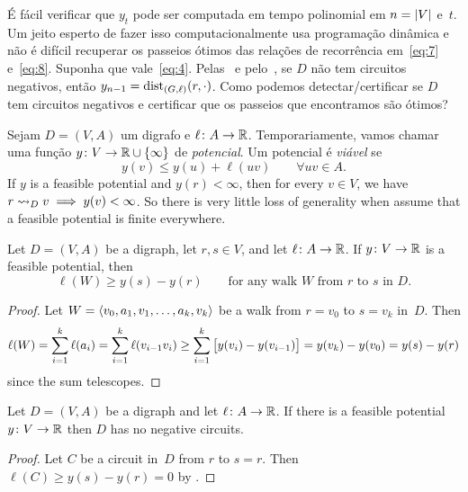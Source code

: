 \documentclass[10pt,reqno]{amsart}
\begin{document}
É fácil verificar que \(y_t\) pode ser computada em tempo polinomial em
\(n = \card{V}\) e~\(t\).  Um jeito esperto de fazer isso computacionalmente
usa programação dinâmica e não é difícil recuperar os passeios ótimos das 
relações de recorrência em~\eqref{eq:7} e~\eqref{eq:8}.
Suponha que vale~\eqref{eq:4}.  Pelas~
e pelo~, se \(D\) não tem circuitos negativos, então
\(y_{n-1} = \dist_{(G,\ell)}(r,\cdot)\).  Como podemos detectar/certificar
se \(D\) tem circuitos negativos e certificar que os passeios que encontramos
são ótimos?

Sejam \(D = (V,A)\) um digrafo e \(\ell \colon A \to \Reals\).
Temporariamente, vamos chamar uma função
\(y \colon V \to \Reals \cup \set{\infty}\) de \emph{potencial}.  Um
potencial é \emph{viável} se
\begin{equation*}
  y(v) \leq y(u) + \ell(uv)
  \qquad
  \forall uv \in A.
\end{equation*}
If \(y\) is a feasible potential and \(y(r) < \infty\), then for every
\(v \in V\), we have \(r \reaches_D v \implies y(v) < \infty\).  So
there is very little loss of generality when assume that a feasible
potential is finite everywhere.

\begin{theorem}
  \label{thm:1}
  Let \(D = (V,A)\) be a digraph, let \(r,s \in V\), and let
  \(\ell \colon A \to \Reals\).  If \(y \colon V \to \Reals\) is a
  feasible potential, then
  \begin{equation}
    \label{eq:11}
    \ell(W) \geq y(s) - y(r)
    \qquad
    \text{for any walk~\(W\) from~\(r\) to~\(s\) in~\(D\)}.
  \end{equation}
\end{theorem}
\begin{proof}
  Let \(W = \seq{v_0,a_1,v_1,\dotsc,a_k,v_k}\) be a walk from
  \(r = v_0\) to \(s = v_k\) in~\(D\).  Then
  \begin{equation*}
    \ell(W)
    =
    \sum_{i=1}^k \ell(a_i)
    =
    \sum_{i=1}^k \ell(v_{i-1}v_i)
    \geq
    \sum_{i=1}^k \sqbrac[\big]{y(v_i)-y(v_{i-1})}
    =
    y(v_k) - y(v_0)
    =
    y(s) - y(r)
  \end{equation*}
  since the sum telescopes.
\end{proof}

\begin{corollary}
  Let \(D = (V,A)\) be a digraph and let \(\ell \colon A \to \Reals\).
  If there is a feasible potential \(y \colon V \to \Reals\) then
  \(D\) has no negative circuits.
\end{corollary}
\begin{proof}
  Let \(C\) be a circuit in~\(D\) from \(r\) to \(s = r\).  Then
  \(\ell(C) \geq y(s) - y(r) = 0\) by .
\end{proof}
\end{document}
